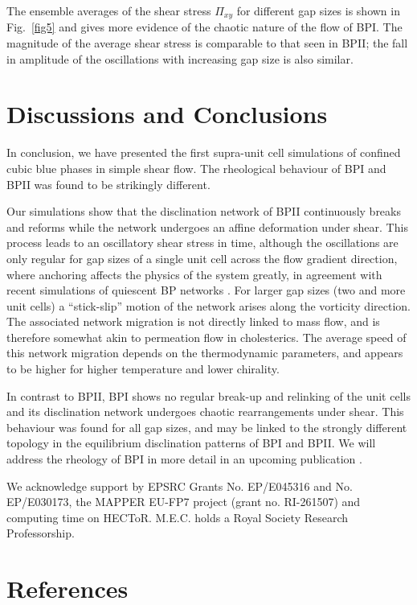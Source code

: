 \documentclass[12pt,twoside]{iopart}
\begin{document}
The ensemble averages of the shear stress $\Pi_{xy}$ for different gap sizes
is shown in Fig.~\ref{fig5} and gives more evidence of the chaotic nature of
the flow of BPI. The magnitude of the average shear stress is comparable to
that seen in BPII; the fall in amplitude of the oscillations with increasing
gap size is also similar.

\section{Discussions and Conclusions}

In conclusion, we have presented the first supra-unit cell simulations of
confined cubic blue phases in simple shear flow.
The rheological behaviour of BPI and BPII was found to be strikingly different.

Our simulations show that the disclination network of BPII continuously breaks and reforms while the network undergoes an affine deformation under shear. This process leads to an oscillatory shear stress in time, although the oscillations are only regular for gap sizes of a single unit cell across the flow gradient direction, where anchoring affects the physics of the system greatly, in agreement with recent simulations of quiescent BP networks \cite{Fukuda:2010a, Fukuda:2010b, Ravnik:2011b}.
For larger gap sizes (two and more unit cells) a ``stick-slip'' motion of
the network arises along the vorticity direction. The associated network
migration is not directly linked to mass flow, and is therefore somewhat
akin to permeation flow in cholesterics. The average speed of this network
migration depends on the thermodynamic parameters, and appears to be higher
for higher temperature and lower chirality. 

In contrast to BPII, BPI shows no regular break-up and relinking of the unit cells and its disclination network undergoes chaotic rearrangements under shear.
This behaviour was found for all gap sizes, and may be linked to the
strongly different topology in the equilibrium disclination patterns of
BPI and BPII. We will address the rheology of BPI in more detail in an
upcoming publication \cite{Henrich:2012}.  

\ack
We acknowledge support by EPSRC Grants No. EP/E045316 and No. EP/E030173,
the MAPPER EU-FP7 project (grant no. RI-261507) and computing time on HECToR.
M.E.C. holds a Royal Society Research Professorship.


\section*{References}



\end{document}
